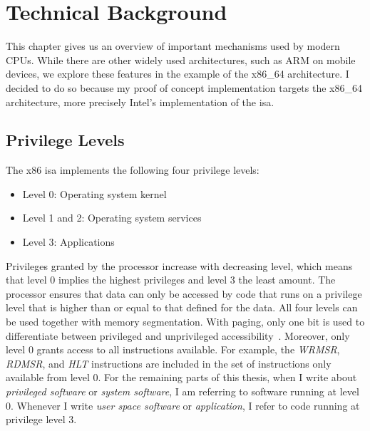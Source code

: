 \section{Technical Background}
\label{sec:state:technical}
This chapter gives us an overview of important mechanisms used by modern CPUs.
While there are other widely used architectures, such as ARM on mobile devices,
we explore these features in the example of the x86\_64 architecture. I decided
to do so because my proof of concept implementation targets the x86\_64
architecture, more precisely Intel's implementation of the \gls{isa}.

\subsection{Privilege Levels}
\label{sec:state:technical:priv}
The x86 \gls{isa} implements the following four privilege levels:
\begin{itemize}
  \item Level 0: Operating system kernel
  \item Level 1 and 2: Operating system services
  \item Level 3: Applications
\end{itemize}
Privileges granted by the processor increase with decreasing level, which means
that level 0 implies the highest privileges and level 3 the least amount. The
processor ensures that data can only be accessed by code that runs on a
privilege level that is higher than or equal to that defined for the data. All
four levels can be used together with memory segmentation. With paging, only one
bit is used to differentiate between privileged and unprivileged
accessibility~\cite{intel_sdm}. Moreover, only level 0 grants access to all
instructions available. For example, the \textit{WRMSR}, \textit{RDMSR}, and
\textit{HLT} instructions are included in the set of instructions only available
from level 0. For the remaining parts of this thesis, when I write about
\textit{privileged software} or \textit{system software}, I am referring to
software running at level 0. Whenever I write \textit{user space software} or
\textit{application}, I refer to code running at privilege level 3.

